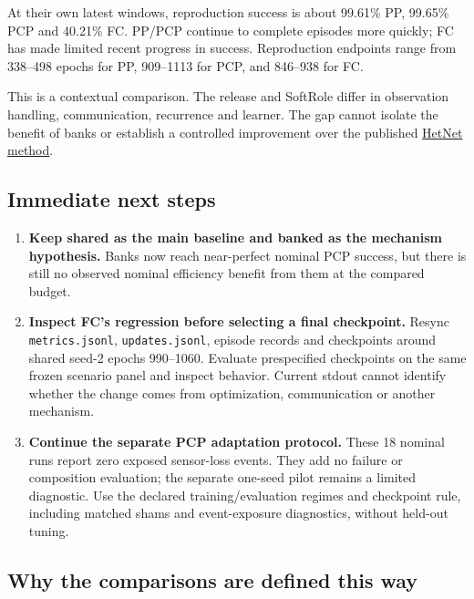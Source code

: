 \documentclass[
  10pt,
]{article}
\providecommand{\tightlist}{%
  \setlength{\itemsep}{0pt}\setlength{\parskip}{0pt}}
\begin{document}
At their own latest windows, reproduction success is about 99.61\% PP,
99.65\% PCP and 40.21\% FC. PP/PCP continue to complete episodes more
quickly; FC has made limited recent progress in success. Reproduction
endpoints range from 338--498 epochs for PP, 909--1113 for PCP, and
846--938 for FC.

This is a contextual comparison. The release and SoftRole differ in
observation handling, communication, recurrence and learner. The gap
cannot isolate the benefit of banks or establish a controlled
improvement over the published
\href{https://ifaamas.org/Proceedings/aamas2022/pdfs/p1173.pdf}{HetNet
method}.

\subsection{Immediate next steps}\label{immediate-next-steps}

\begin{enumerate}
\def\labelenumi{\arabic{enumi}.}
\tightlist
\item
  \textbf{Keep shared as the main baseline and banked as the mechanism
  hypothesis.} Banks now reach near-perfect nominal PCP success, but
  there is still no observed nominal efficiency benefit from them at the
  compared budget.
\item
  \textbf{Inspect FC's regression before selecting a final checkpoint.}
  Resync \texttt{metrics.jsonl}, \texttt{updates.jsonl}, episode records
  and checkpoints around shared seed-2 epochs 990--1060. Evaluate
  prespecified checkpoints on the same frozen scenario panel and inspect
  behavior. Current stdout cannot identify whether the change comes from
  optimization, communication or another mechanism.
\item
  \textbf{Continue the separate PCP adaptation protocol.} These 18
  nominal runs report zero exposed sensor-loss events. They add no
  failure or composition evaluation; the separate one-seed pilot remains
  a limited diagnostic. Use the declared training/evaluation regimes and
  checkpoint rule, including matched shams and event-exposure
  diagnostics, without held-out tuning.
\end{enumerate}

\subsection{Why the comparisons are defined this
way}\label{why-the-comparisons-are-defined-this-way}
\end{document}
